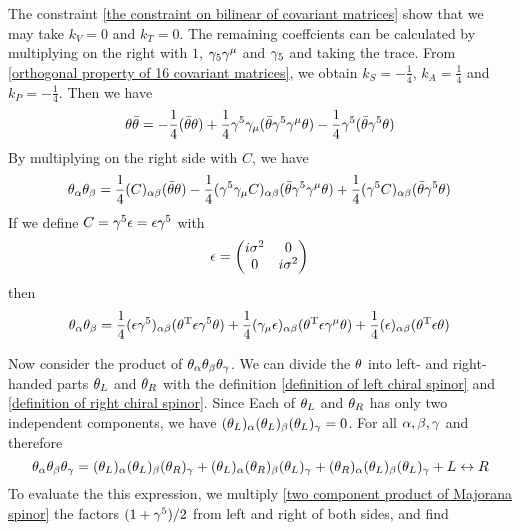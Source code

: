 The constraint \eqref{the constraint on bilinear of covariant matrices} show that we may take $k_V = 0$ and $k_T = 0$. The remaining coeffcients can be calculated by multiplying on the right with $1$, $\gamma_{5}\gamma^{\mu}$ and $\gamma_{5}$ and taking the trace. From \eqref{orthogonal property of 16 covariant matrices}, we obtain $k_S = -\frac{1}{4}$, $k_A = \frac{1}{4}$ and $k_P = -\frac{1}{4}$. Then we have
\begin{equation}
\theta\bar{\theta}=
-\frac{1}{4}(\bar{\theta}\theta)+
\frac{1}{4}\gamma^5\gamma_{\mu}(\bar{\theta}\gamma^5\gamma^{\mu}\theta)
-\frac{1}{4}\gamma^5(\bar{\theta}\gamma^{5}\theta)
\end{equation}  
By multiplying on the right side with $C$, we have
\begin{equation}
\theta_{\alpha}\theta_{\beta} = 
\frac{1}{4} (C)_{\alpha\beta} (\bar{\theta}\theta)- 
\frac{1}{4}(\gamma^5\gamma_{\mu}C)_{\alpha\beta}(\bar{\theta}\gamma^5\gamma^{\mu}\theta)+
\frac{1}{4}(\gamma^5C)_{\alpha\beta}(\bar{\theta}\gamma^{5}\theta)
\end{equation}
If we define $C = \gamma^5\epsilon = \epsilon\gamma^5$ with 
\begin{equation}
\e = \mqty(i\s^2 &  0 \\
             0    & i\s^2)
\end{equation}
then 
\begin{equation}\label{two component product of Majorana spinor}
\theta_{\alpha}\theta_{\beta} = 
\frac{1}{4} (\epsilon\gamma^5)_{\alpha\beta} (\theta^{\text{T}}\epsilon\gamma^5\theta)+ 
\frac{1}{4}(\gamma_{\mu}\epsilon)_{\alpha\beta}({\theta}^{\text{T}}\epsilon\gamma^{\mu}\theta)+
\frac{1}{4}(\epsilon)_{\alpha\beta}(\theta^{\text{T}}\epsilon\theta)
\end{equation}

Now consider the product of $\theta_{\alpha}\theta_{\beta}\theta_{\gamma}$. We can divide the $\theta$ into left- and right-handed parts $\theta_L$ and $\theta_R$ with the definition \eqref{definition of left chiral spinor} and \eqref{definition of right chiral spinor}. Since Each of $\theta_L$ and $\theta_R$ has only two independent components, we have
$(\theta_L)_{\alpha}(\theta_L)_{\beta}(\theta_L)_{\gamma} = 0$. For all $\alpha,\beta,\gamma$ and therefore
\begin{equation}\label{decomposition of three product of Majorana spinors}
\theta_\alpha \theta_\beta \theta_\gamma = 
(\theta_L)_\alpha(\theta_L)_\beta(\theta_R)_\gamma+
(\theta_L)_\alpha(\theta_R)_\beta(\theta_L)_\gamma+
(\theta_R)_\alpha(\theta_L)_\beta(\theta_L)_\gamma
+ L\leftrightarrow R
\end{equation}  
To evaluate the this expression, 
we multiply 
\eqref{two component product of Majorana spinor}
the factors $(1+\gamma^5)/2$ 
from left and right of both sides, and find

